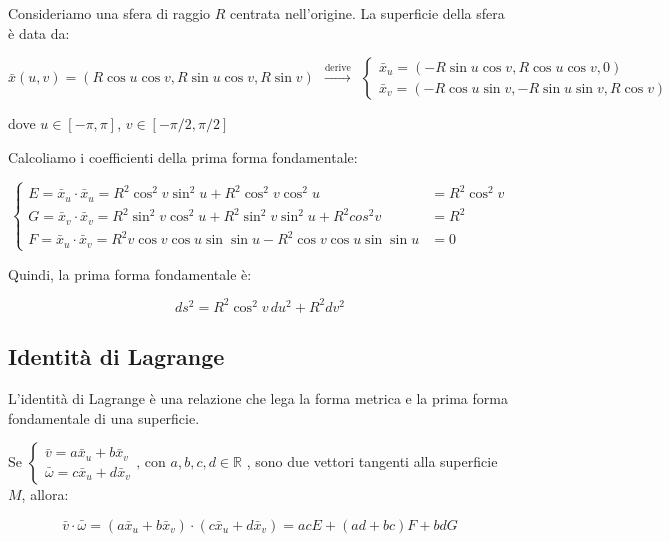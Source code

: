 \begin{exampleblock}

    Consideriamo una sfera di raggio $R$ centrata nell'origine. La superficie della sfera è data da:
    
    \small
    $$
    \bar x(u,v) = (R \cos u \cos v, R \sin u \cos v, R \sin v)
    \ \ \xrightarrow{\text{derive}} \ \
    \begin{cases}
        \bar x_u = (-R \sin u \cos v, R \cos u \cos v, 0)
        \\
        \bar x_v = (-R \cos u \sin v, -R \sin u \sin v, R \cos v)
    \end{cases}
    $$
    \normalsize
    
    dove $u \in [-\pi, \pi]$, $v \in [-\pi/2, \pi/2]$
    
    Calcoliamo i coefficienti della prima forma fondamentale:
    
    $$
    \begin{cases}
    E = \bar{x}_u \cdot \bar{x}_u = R^2 \cos^2 v \sin^2 u + R^2 \cos^2 v \cos^2 u & = R^2 \cos^2 v
    \\
    G = \bar{x}_v \cdot \bar{x}_v = R^2 \sin^2 v \cos^2 u + R^2 \sin^2 v \sin^2 u + R^2 cos^2 v & = R^2 
    \\
    F = \bar{x}_u \cdot \bar{x}_v = R^2 v \cos v \cos u \sin \sin u - R^2 \cos v \cos u \sin \sin u & = 0
    \end{cases}
    $$
    
    Quindi, la prima forma fondamentale è:
    
    $$
    ds^2 = R^2 \cos^2 v\, du^2 + R^2 dv^2
    $$
    
\end{exampleblock}

\subsection{Identità di Lagrange}

L'identità di Lagrange è una relazione che lega la forma metrica e la prima forma fondamentale di una superficie.

Se
$
\begin{cases}
    \bar v = a\bar x_u + b\bar x_v \\ 
    \bar \omega = c\bar x_u + d\bar x_v
\end{cases}
\text{, con } a,b,c,d \in \mathbb{R}
$
, sono due vettori tangenti alla superficie $M$, allora:

$$
\bar v \cdot \bar \omega = (a\bar x_u + b\bar x_v) \cdot (c\bar x_u + d\bar x_v) = acE + (ad + bc)F + bdG
$$

